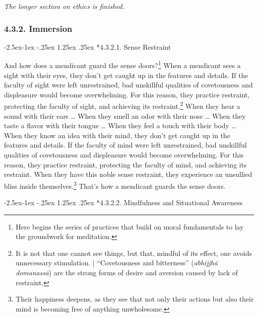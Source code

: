 \documentclass[12pt,openany]{book}%
\makeatletter
\renewcommand\paragraph{\@startsection{paragraph}{4}{\z@}%
            {-2.5ex\@plus -1ex \@minus -.25ex}%
            {1.25ex \@plus .25ex}%
            {\noindent\normalfont\itshape\small}}
\newcommand*{\scendsection}[1]{\begin{Center}\begin{small}\textit{#1}\end{small}\end{Center}\addvspace{1em}}
\makeatother
\begin{document}
\scendsection{The longer section on ethics is finished. }

\subsubsection*{4.3.2. Immersion }

\paragraph*{4.3.2.1. Sense Restraint }

And how does a mendicant guard the sense doors?\footnote{Here begins the series of practices that build on moral fundamentals to lay the groundwork for meditation. } When a mendicant sees a sight with their eyes, they don’t get caught up in the features and details. If the faculty of sight were left unrestrained, bad unskillful qualities of covetousness and displeasure would become overwhelming. For this reason, they practice restraint, protecting the faculty of sight, and achieving its restraint.\footnote{It is not that one cannot see things, but that, mindful of its effect, one avoids unnecessary stimulation. | “Covetousness and bitterness” (\textit{\textsanskrit{abhijjhā} \textsanskrit{domanassā}}) are the strong forms of desire and aversion caused by lack of restraint. } When they hear a sound with their ears … When they smell an odor with their nose … When they taste a flavor with their tongue … When they feel a touch with their body … When they know an idea with their mind, they don’t get caught up in the features and details. If the faculty of mind were left unrestrained, bad unskillful qualities of covetousness and displeasure would become overwhelming. For this reason, they practice restraint, protecting the faculty of mind, and achieving its restraint. When they have this noble sense restraint, they experience an unsullied bliss inside themselves.\footnote{Their happiness deepens, as they see that not only their actions but also their mind is becoming free of anything unwholesome. } That’s how a mendicant guards the sense doors. 

\paragraph*{4.3.2.2. Mindfulness and Situational Awareness }
\end{document}

